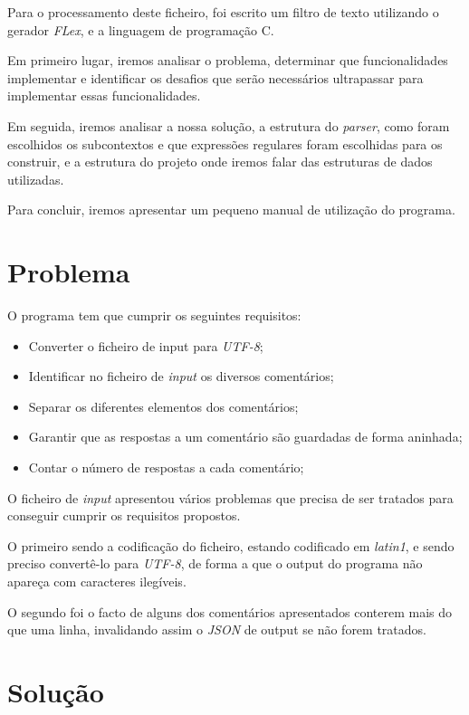 \documentclass[a4paper]{report}
\begin{document}
Para o processamento deste ficheiro, foi escrito um filtro de texto utilizando 
o gerador \textit{FLex}, e a linguagem de programação C.

Em primeiro lugar, iremos analisar o problema, determinar que funcionalidades 
implementar e identificar os desafios que serão necessários ultrapassar
para implementar essas funcionalidades.

Em seguida, iremos analisar a nossa solução, a estrutura do \textit{parser},
como foram escolhidos os subcontextos e que expressões regulares foram
escolhidas para os construir, e a estrutura do projeto onde iremos falar
das estruturas de dados utilizadas.

Para concluir, iremos apresentar um pequeno manual de utilização do programa.

\chapter{Problema}

O programa tem que cumprir os seguintes requisitos:
\begin{itemize}
    \item Converter o ficheiro de input para \textit{UTF-8};
    \item Identificar no ficheiro de \textit{input} os diversos comentários;
    \item Separar os diferentes elementos dos comentários;
    \item Garantir que as respostas a um comentário são guardadas de forma
        aninhada;
    \item Contar o número de respostas a cada comentário;
\end{itemize}

O ficheiro de \textit{input} apresentou vários problemas que precisa de ser
tratados para conseguir cumprir os requisitos propostos.

O primeiro sendo a codificação do ficheiro, estando codificado em \textit{latin1},
e sendo preciso convertê-lo para \textit{UTF-8}, de forma a que o output do 
programa não apareça com caracteres ilegíveis.

O segundo foi o facto de alguns dos comentários apresentados conterem mais do que
uma linha, invalidando assim o \textit{JSON} de output se não forem tratados.

\chapter{Solução}
\end{document}

